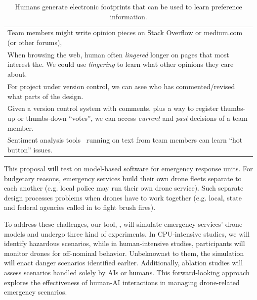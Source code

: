 \documentclass[twoside]{NSF}
\newcommand{\IT}{{\sffamily {\em \mbox{ADVICE}}}}
\newenvironment{formal}{%
  \vspace{-5pt}\def\FrameCommand{%
     \vspace{-10pt} \hspace{1pt}%
    {\color{darkblue}\vrule width 2pt}%
    {\color{formalshade}\vrule width 4pt}%
    \colorbox{formalshade}%
  }%
  \MakeFramed{\advance\hsize-\width\FrameRestore}%
  \noindent\hspace{-1pt}%
  \begin{adjustwidth}{}{7pt}%
     
}
{%
  \vspace{0pt}\end{adjustwidth}\endMakeFramed%
}
\begin{document}
\begin{nsfdescription}
 

\begin{table}[!b]
\small
 \begin{tabular}{|p{.98\linewidth}|}\hline
 
\rowcolor{blue!10}
Team members might write opinion pieces on  Stack Overflow or medium.com 
(or other   forums), 
\\
When browsing the web, human often 
{\em lingered} longer on   pages that most interest the.  We could use  {\em lingering} to learn what
other opinions they   care about.
\\\rowcolor{blue!10}
For project under
version control, we can asee
who has commented/revised what parts of
the design.
\\
Given a version control system with comments, plus a way to register 
thumbs-up or thumbs-down ``votes'', 
we can access {\em current} and 
{\em past} decisions
of a team member.
\\\rowcolor{blue!10}
Sentiment analysis tools~\cite{novielli2015challenges}  running on text from team members
 can learn   ``hot button''
issues. \\\hline
\end{tabular}
 \caption{ Humans generate    electronic footprints that can be used   to learn    preference information.
 }\label{info}
\end{table}

This proposal will test {\IT}  on model-based software for emergency response units. 
For budgetary reasons,   emergency services   build their own drone fleets separate to each another
 (e.g.   local police
may run their own drone service). Such separate design processes    problems  when   drones have to work together   (e.g.   local, state and federal agencies called in to fight
brush fires).

To address these challenges, our tool, {\IT}, will simulate emergency services' drone models and undergo three kind of experiments. In CPU-intensive studies, we will identify hazardous scenarios, while in human-intensive studies, participants will monitor drones for off-nominal behavior. Unbeknownst to them, the simulation will enact danger scenarios identified earlier. Additionally, ablation studies will assess scenarios handled solely by AIs or humans. This forward-looking approach explores the effectiveness of human-AI interactions in managing drone-related emergency scenarios.


\end{nsfdescription}
\end{document}
